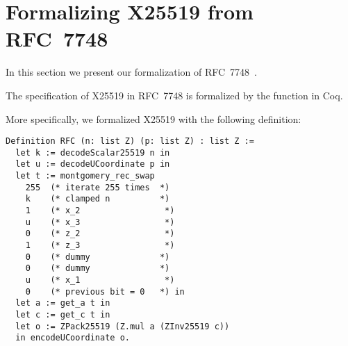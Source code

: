 \section{Formalizing X25519 from RFC~7748}
\label{sec:Coq-RFC}

In this section we present our formalization of RFC~7748~\cite{rfc7748}.

\begin{informaltheorem}
  The specification of X25519 in RFC~7748 is formalized by the function  in Coq.
\end{informaltheorem}

More specifically, we formalized X25519 with the following definition:
\begin{lstlisting}[language=Coq]
Definition RFC (n: list Z) (p: list Z) : list Z :=
  let k := decodeScalar25519 n in
  let u := decodeUCoordinate p in
  let t := montgomery_rec_swap
    255  (* iterate 255 times  *)
    k    (* clamped n          *)
    1    (* x_2                 *)
    u    (* x_3                 *)
    0    (* z_2                 *)
    1    (* z_3                 *)
    0    (* dummy              *)
    0    (* dummy              *)
    u    (* x_1                 *)
    0    (* previous bit = 0   *) in
  let a := get_a t in
  let c := get_c t in
  let o := ZPack25519 (Z.mul a (ZInv25519 c))
  in encodeUCoordinate o.
\end{lstlisting}

